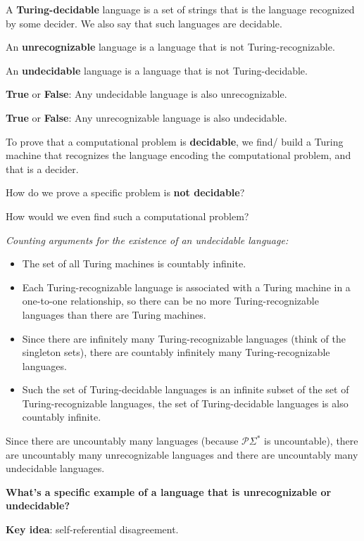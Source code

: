 \documentclass[12pt, oneside]{article}
\begin{document}
A {\bf Turing-decidable} language is a set of strings that 
is the language recognized by some decider. We also 
say that such languages are decidable.

An {\bf unrecognizable} language is a language that is not Turing-recognizable.

An {\bf undecidable} language is a language that is not Turing-decidable.


{\bf  True} or {\bf False}: Any  undecidable language  is  also  unrecognizable.


{\bf  True} or {\bf False}: Any  unrecognizable language  is  also  undecidable.


To prove that a computational problem is {\bf decidable}, we find/ build a Turing 
machine that recognizes the language encoding the computational problem, and that 
is a decider.


How do we prove a specific problem is {\bf not decidable}?

How would we even find such a computational problem?


{\it Counting arguments for the existence of an undecidable language:}
\begin{itemize}
    \item The set of all Turing machines is countably infinite.
    \item Each Turing-recognizable language is associated with a Turing machine
    in a one-to-one relationship, so there can be no more Turing-recognizable
    languages than there are Turing machines. 
    \item Since there are infinitely many Turing-recognizable languages
    (think of the singleton sets), there are countably infinitely 
    many Turing-recognizable languages.
    \item Such the set of Turing-decidable languages is an infinite subset 
    of the set of Turing-recognizable languages, the set of 
    Turing-decidable languages is also countably infinite.
\end{itemize}

Since there are uncountably many languages (because $\mathcal{P}{\Sigma^*}$
is uncountable), there are uncountably many unrecognizable languages
and there are uncountably many undecidable languages.

\vfill

{\bf What's a specific example of a language that is unrecognizable or undecidable?}

{\bf Key idea}: self-referential disagreement.
\end{document}
